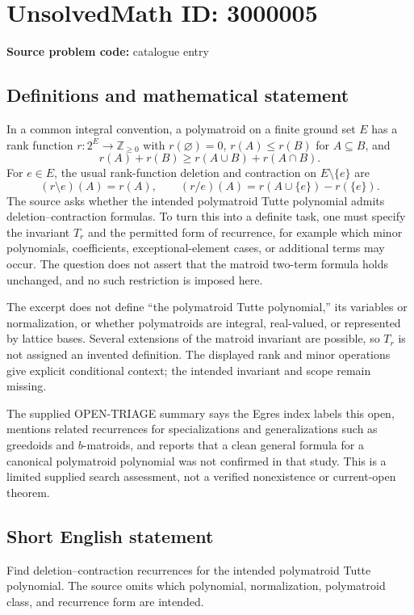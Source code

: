 \documentclass[11pt]{article}
\newcommand{\Z}{\mathbb{Z}}
\begin{document}
\section*{UnsolvedMath ID: 3000005}
\textbf{Source problem code:} catalogue entry
\subsection{Definitions and mathematical statement}
In a common integral convention, a polymatroid on a finite ground set \(E\) has a rank function \(r:2^E\to\Z_{\ge0}\) with \(r(\varnothing)=0\), \(r(A)\le r(B)\) for \(A\subseteq B\), and
\[
r(A)+r(B)\ge r(A\cup B)+r(A\cap B).
\]
For \(e\in E\), the usual rank-function deletion and contraction on \(E\setminus\{e\}\) are
\[
(r\setminus e)(A)=r(A),\qquad
(r/e)(A)=r(A\cup\{e\})-r(\{e\}).
\]
The source asks whether the intended polymatroid Tutte polynomial admits deletion--contraction formulas. To turn this into a definite task, one must specify the invariant \(T_r\) and the permitted form of recurrence, for example which minor polynomials, coefficients, exceptional-element cases, or additional terms may occur. The question does not assert that the matroid two-term formula holds unchanged, and no such restriction is imposed here.

The excerpt does not define ``the polymatroid Tutte polynomial,'' its variables or normalization, or whether polymatroids are integral, real-valued, or represented by lattice bases. Several extensions of the matroid invariant are possible, so \(T_r\) is not assigned an invented definition. The displayed rank and minor operations give explicit conditional context; the intended invariant and scope remain missing.

The supplied OPEN-TRIAGE summary says the Egres index labels this open, mentions related recurrences for specializations and generalizations such as greedoids and \(b\)-matroids, and reports that a clean general formula for a canonical polymatroid polynomial was not confirmed in that study. This is a limited supplied search assessment, not a verified nonexistence or current-open theorem.
\subsection{Short English statement}
Find deletion--contraction recurrences for the intended polymatroid Tutte polynomial. The source omits which polynomial, normalization, polymatroid class, and recurrence form are intended.
\end{document}
